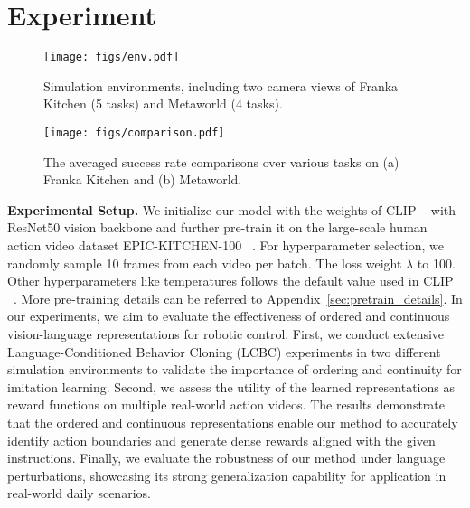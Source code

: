 \section{Experiment}
\begin{figure}[t]
\begin{center}
\centerline{\texttt{[image: figs/env.pdf]}}
\caption{Simulation environments, including two camera views of Franka Kitchen (5 tasks) and Metaworld (4 tasks).}
\label{env}
\end{center}
\end{figure}

\begin{figure*}[t]
\begin{center}
\centerline{\texttt{[image: figs/comparison.pdf]}}
\caption{The averaged success rate comparisons over various tasks on (a) Franka Kitchen and (b) Metaworld.}
\label{fig:comparison}
\end{center}
\vskip -0.2in
\end{figure*}


\noindent\textbf{Experimental Setup.} We initialize our model with the weights of CLIP ~\cite{icml21-clip} with ResNet50 vision backbone and further pre-train it on the large-scale human action video dataset EPIC-KITCHEN-100 ~\cite{corr18-epickitchen,corr20-epickitchen}. For hyperparameter selection, we randomly sample 10 frames from each video per batch. The loss weight \( \lambda \) to 100. Other hyperparameters like temperatures follows the default value used in CLIP ~\cite{icml21-clip}. More pre-training details can be referred to Appendix~\ref{sec:pretrain_details}.
In our experiments, we aim to evaluate the effectiveness of ordered and continuous vision-language representations for robotic control. First, we conduct extensive Language-Conditioned Behavior Cloning (LCBC) experiments in two different simulation environments to validate the importance of ordering and continuity for imitation learning. Second, we assess the utility of the learned representations as reward functions on multiple real-world action videos. The results demonstrate that the ordered and continuous representations enable our method to accurately identify action boundaries and generate dense rewards aligned with the given instructions. Finally, we evaluate the robustness of our method under language perturbations, showcasing its strong generalization capability for application in real-world daily scenarios.

